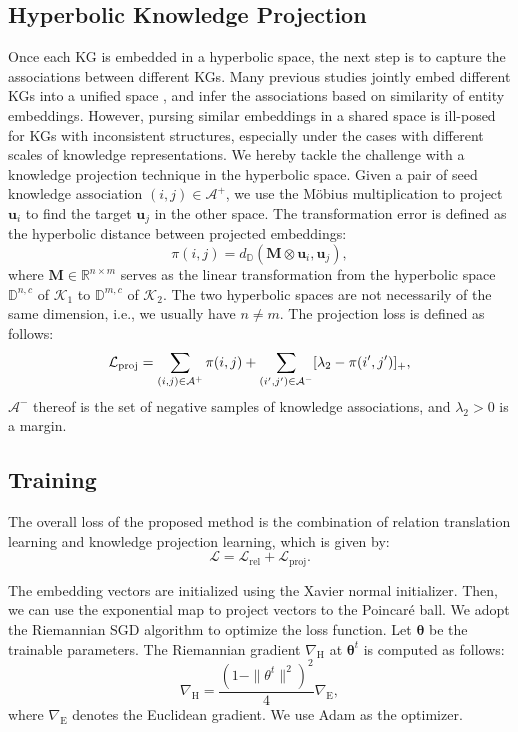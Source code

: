 \documentclass[11pt,a4paper]{article}
\begin{document}
\subsection{Hyperbolic Knowledge Projection}
Once each KG is embedded in a hyperbolic space, the next step is to capture the associations between different KGs. Many previous studies jointly embed different KGs into a unified space \cite{JAPE,GCN_Align,KECG}, and infer the associations based on similarity of entity embeddings. However, pursing similar embeddings in a shared space is ill-posed for KGs with inconsistent structures, especially under the cases with different scales of knowledge representations. We hereby tackle the challenge with a knowledge projection technique in the hyperbolic space. Given a pair of seed knowledge association $(i,j)\in\mathcal{A}^+$, we use the M\"obius multiplication to project $\mathbf{u}_i$ to find the target $\mathbf{u}_j$ in the other space. The transformation error is defined as the hyperbolic distance between projected embeddings:
\begin{equation}
  \label{eq:proj_error}
\pi(i,j) = d_{\mathbb{D}}(\mathbf{M}\otimes\mathbf{u}_i,\mathbf{u}_j),
\end{equation}
where $\mathbf{M}\in \mathbb{R}^{n\times m}$ serves as the linear transformation from the hyperbolic space $\mathbb{D}^{n,c}$ of $\mathcal{K}_1$ to $\mathbb{D}^{m,c}$ of $\mathcal{K}_2$. The two hyperbolic spaces are not necessarily of the same dimension, i.e., we usually have $n\neq m$. The projection loss is defined as follows:
\begin{equation}
  \label{eq:proj_loss}\small
  \mathcal{L}_{\text{proj}}=\sum_{(i,j)\in\mathcal{A}^+}\pi(i,j)  + \sum_{(i',j')\in\mathcal{A}^{-}}[\lambda_2-\pi(i',j')]_+,
\end{equation}
$\mathcal{A}^{-}$ thereof is the set of negative samples of knowledge associations, and $\lambda_2>0$ is a margin. 

\subsection{Training}
The overall loss of the proposed method is the combination of relation translation learning and knowledge projection learning, which is given by:
\begin{equation}
  \label{eq:loss}
  \mathcal{L} =\mathcal{L}_{\text{rel}} + \mathcal{L}_{\text{proj}}.
\end{equation}

\noindent
The embedding vectors are initialized using the Xavier normal initializer. Then, we can use the exponential map to project vectors to the Poincar\'e ball. We adopt the Riemannian SGD algorithm \cite{Bonnabel13RSGD} to optimize the loss function. Let $\mathbf{\theta}$ be the trainable parameters. The Riemannian gradient $\nabla_{\text{H}}$ at $\mathbf{\theta}^t$ is computed as follows:
\begin{equation}
  \label{eq:gradient}
 \nabla_{\text{H}}= \frac{(1-\|\theta^t\|^2)^2}{4} \nabla_{\text{E}},
\end{equation}
where $\nabla_{\text{E}}$ denotes the Euclidean gradient. We use Adam \cite{Adam} as the optimizer.
\end{document}
